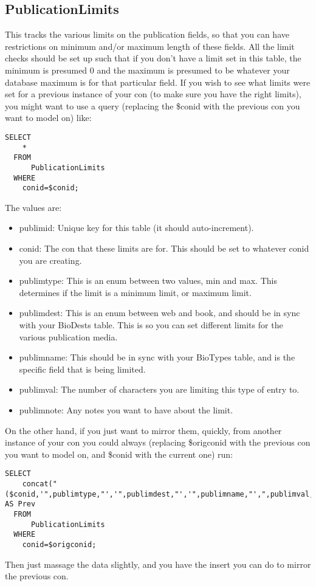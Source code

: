 \documentclass[captions=tablesignature]{scrartcl}
\begin{document}
\subsection{PublicationLimits}
\label{sec-12-1}
This tracks the various limits on the publication fields, so that
you can have restrictions on minimum and/or maximum length of these
fields.  All the limit checks should be set up such that if you
don't have a limit set in this table, the minimum is presumed 0 and
the maximum is presumed to be whatever your database maximum is for
that particular field.  If you wish to see what limits were set for
a previous instance of your con (to make sure you have the right
limits), you might want to use a query (replacing the \$conid with
the previous con you want to model on) like:
\begin{verbatim}
SELECT
    *
  FROM
      PublicationLimits
  WHERE
    conid=$conid;
\end{verbatim}
The values are:
\begin{itemize}
\item publimid: Unique key for this table (it should auto-increment).
\item conid: The con that these limits are for.  This should be set to
whatever conid you are creating.
\item publimtype: This is an enum between two values, min and max.
This determines if the limit is a minimum limit, or maximum
limit.
\item publimdest: This is an enum between web and book, and should be
in sync with your BioDests table.  This is so you can set
different limits for the various publication media.
\item publimname: This should be in sync with your BioTypes table, and
is the specific field that is being limited.
\item publimval: The number of characters you are limiting this type of
entry to.
\item publimnote: Any notes you want to have about the limit.
\end{itemize}

On the other hand, if you just want to mirror them, quickly, from
another instance of your con you could always (replacing \$origconid
with the previous con you want to model on, and \$conid with the
current one) run:
\begin{verbatim}
SELECT
    concat("($conid,'",publimtype,"','",publimdest,"','",publimname,"',",publimval,",'",publimnote,"'),") AS Prev
  FROM
      PublicationLimits
  WHERE
    conid=$origconid;
\end{verbatim}
Then just massage the data slightly, and you have the insert you
can do to mirror the previous con.
\end{document}
